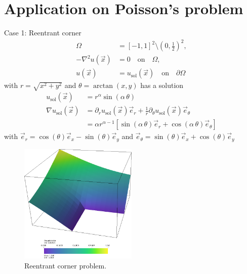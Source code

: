 \chapter{Application on Poisson's problem}
\label{ch:results}

Case 1: Reentrant corner
\begin{align}
  \Omega &= \left[-1,1\right]^2 \setminus \left(0,\frac{1}{2}\right)^2 ,\\
  - \nabla^2 u(\vec{x}) &= 0 \quad\text{on}\quad \Omega,\\
  u(\vec{x}) &= u_\text{sol}(\vec{x}) \quad\text{on}\quad \partial\Omega
\end{align}
with \(r = \sqrt{x^2 + y^2}\) and \(\theta = \arctan(x,y) \) has a solution
\begin{align}
  u_\text{sol}(\vec{x}) &= r^\alpha \sin(\alpha \, \theta) \\
  \nabla u_\text{sol}(\vec{x}) &= \partial_r u_\text{sol}(\vec{x}) \vec{e}_r + \frac{1}{r} \partial_\theta u_\text{sol}(\vec{x}) \vec{e}_\theta \\
  &= \alpha r^{\alpha - 1} \left[ \sin(\alpha \, \theta) \vec{e}_r + \cos(\alpha \, \theta) \vec{e}_\theta \right]
\end{align}
with \(\vec{e}_r = \cos(\theta) \vec{e}_x - \sin(\theta) \vec{e}_y\) and \(\vec{e}_\theta = \sin(\theta) \vec{e}_x + \cos(\theta) \vec{e}_y\)

\begin{figure}
\centering
\includegraphics[width=0.5\textwidth]{figures/results/solution.png}
\caption{Reentrant corner problem.}
\label{fig:solution}
\end{figure}

